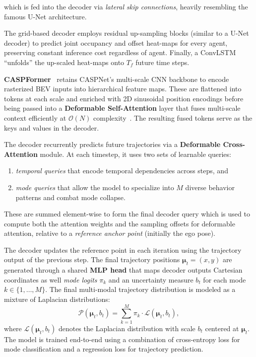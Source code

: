 which is fed into the decoder via \emph{lateral skip connections}, heavily resembling the famous U-Net architecture.

The grid-based decoder employs residual up-sampling blocks (similar to a U-Net decoder) to predict joint occupancy and offset heat-maps for every agent, preserving constant inference cost regardless of agent. Finally, a ConvLSTM ``unfolds'' the up-scaled heat-maps onto \( T_f \) future time steps.

\textbf{CASPFormer}~\cite{caspformerYadav2024} retains CASPNet's multi-scale CNN backbone to encode rasterized BEV inputs into hierarchical feature maps. These are flattened into tokens at each scale and enriched with 2D sinusoidal position encodings before being passed into a \textbf{Deformable Self-Attention} layer that fuses multi-scale context efficiently at $\mathcal{O}(N)$ complexity~\cite{zhu2021deformabledetr}. The resulting fused tokens serve as the keys and values in the decoder.

The decoder recurrently predicts future trajectories via a \textbf{Deformable Cross-Attention} module. At each timestep, it uses two sets of learnable queries:
\begin{enumerate}
    \item \emph{temporal queries} that encode temporal dependencies across steps, and
    \item \emph{mode queries} that allow the model to specialize into $M$ diverse behavior patterns and combat mode collapse.
\end{enumerate}

These are summed element-wise to form the final decoder query which is used to compute both the attention weights and the sampling offsets for deformable attention, relative to a \emph{reference anchor point} (initially the ego pose).

The decoder updates the reference point in each iteration using the trajectory output of the previous step. The final trajectory positions $\boldsymbol{\mu}_t = (x, y)$ are generated through a shared \textbf{MLP head} that maps decoder outputs Cartesian coordinates as well \emph{mode logits} $\pi_k$ and an uncertainty measure \( b_t \) for each mode \( k \in \{1, \ldots, M\} \). The final multi-modal trajectory distribution is modeled as a mixture of Laplacian distributions:
\begin{equation}
\label{eq:caspformer_trajectory_distribution}
\mathcal{P}(\boldsymbol{\mu}_t, b_t) = \sum_{k=1}^{M} \pi_k \cdot \mathcal{L}(\boldsymbol{\mu}_t, b_t),
\end{equation}
where $\mathcal{L}(\boldsymbol{\mu}_t, b_t)$ denotes the Laplacian distribution with scale $b_t$ centered at $\boldsymbol{\mu}_t$. The model is trained end-to-end using a combination of cross-entropy loss for mode classification and a regression loss for trajectory prediction.

